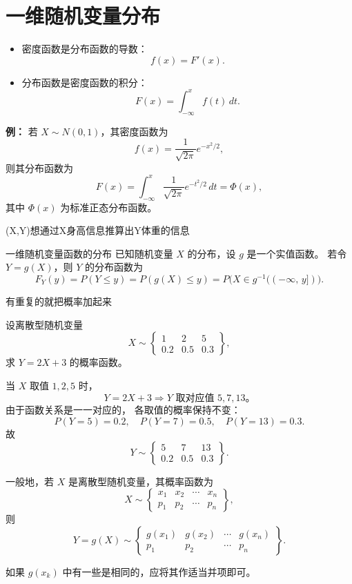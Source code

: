 \section{一维随机变量分布}
\begin{remark}[分布函数与密度函数的关系]
\begin{itemize}
  \item 密度函数是分布函数的导数：
  \[
    f(x) = F'(x).
  \]
  \item 分布函数是密度函数的积分：
  \[
    F(x) = \int_{-\infty}^{x} f(t)\,dt.
  \]
\end{itemize}

\textbf{例：} 若 $X\sim N(0,1)$，其密度函数为
\[
f(x)=\frac{1}{\sqrt{2\pi}}e^{-x^2/2},
\]
则其分布函数为
\[
F(x)=\int_{-\infty}^{x}\frac{1}{\sqrt{2\pi}}e^{-t^2/2}\,dt
=\Phi(x),
\]
其中 $\Phi(x)$ 为标准正态分布函数。
\end{remark}
(X,Y)想通过X身高信息推算出Y体重的信息\\
\begin{remark}一维随机变量函数的分布
已知随机变量 \(X\) 的分布，设 \(g\) 是一个实值函数。  
若令 \(Y = g(X)\)，则 \(Y\) 的分布函数为
\[
F_Y(y)
= P(Y \le y)
= P(g(X) \le y)
= P\!\big(X \in g^{-1}((-\infty,\,y])\big).
\]
\end{remark}
有重复的就把概率加起来
\begin{example}
设离散型随机变量
\[
X \sim 
\begin{Bmatrix}
1 & 2 & 5 \\[3pt]
0.2 & 0.5 & 0.3
\end{Bmatrix},
\]
求 \( Y = 2X + 3 \) 的概率函数。

\begin{solution}
当 \(X\) 取值 \(1, 2, 5\) 时，
\[
Y = 2X + 3
\Rightarrow
Y \text{ 取对应值 } 5, 7, 13。
\]
由于函数关系是一一对应的，
各取值的概率保持不变：
\[
P(Y=5)=0.2,\quad
P(Y=7)=0.5,\quad
P(Y=13)=0.3.
\]
故
\[
Y \sim 
\begin{Bmatrix}
5 & 7 & 13 \\[3pt]
0.2 & 0.5 & 0.3
\end{Bmatrix}.
\]
\end{solution}
\end{example}
\begin{remark}[离散型随机变量函数的分布规律]
一般地，若 \(X\) 是离散型随机变量，其概率函数为
\[
X \sim 
\begin{Bmatrix}
x_1 & x_2 & \cdots & x_n \\[4pt]
p_1 & p_2 & \cdots & p_n
\end{Bmatrix},
\]
则
\[
Y = g(X) \sim 
\begin{Bmatrix}
g(x_1) & g(x_2) & \cdots & g(x_n) \\[4pt]
p_1 & p_2 & \cdots & p_n
\end{Bmatrix}.
\]

如果 \(g(x_k)\) 中有一些是相同的，应将其作适当并项即可。
\end{remark}
